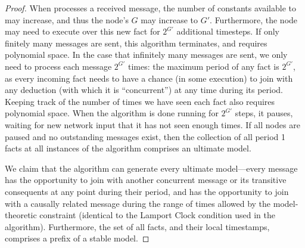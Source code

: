 \begin{proof}
When  processes a received message, the number of constants available to  may increase, and thus the node's $G$ may increase to $G'$.  Furthermore, the node may need to execute over this new fact for $2^{G'}$ additional timesteps.  If only finitely many messages are sent, this algorithm terminates, and requires polynomial space.  In the case that infinitely many messages are sent, we only need to process each message $2^{G'}$ times: the maximum period of any fact is $2^{G'}$, as every incoming fact needs to have a chance (in some execution) to join with any deduction (with which it is ``concurrent'') at any time during its period.  Keeping track of the number of times we have seen each fact also requires polynomial space.  When the algorithm is done running for $2^{G'}$ steps, it pauses, waiting for new network input that it has not seen enough times.  If all nodes are paused and no outstanding messages exist, then the collection of all period 1 facts at all instances of the algorithm comprises an ultimate model.

We claim that the algorithm can generate every ultimate model---every message has the opportunity to join with another concurrent message or its transitive consequents at any point during their period, and has the opportunity to join with a causally related message during the range of times allowed by the model-theoretic constraint (identical to the Lamport Clock condition used in the algorithm).  Furthermore, the set of all facts, and their local timestamps, comprises a prefix of a stable model.


\end{proof}
